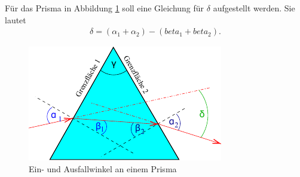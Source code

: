 Für das Prisma in Abbildung \ref{fig:prisma} soll eine Gleichung für $\delta$ aufgestellt werden.
Sie lautet
\begin{align}
    \delta = (\alpha_1 + \alpha_2) - (beta_1 + beta_2). %
    \label{eq:prisma}
\end{align}

\begin{figure}
    \centering
    \includegraphics{11_v400/Abbildungen/Prisma.pdf}
    \caption{Ein- und Ausfallwinkel an einem Prisma}
    \label{fig:prisma}
\end{figure}